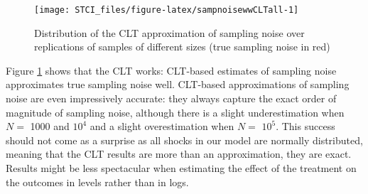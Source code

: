 \documentclass[]{book}
\newenvironment{Shaded}{\begin{snugshade}}{\end{snugshade}}
\newcommand{\ControlFlowTok}[1]{\textcolor[rgb]{0.13,0.29,0.53}{\textbf{#1}}}
\newcommand{\DataTypeTok}[1]{\textcolor[rgb]{0.13,0.29,0.53}{#1}}
\newcommand{\DecValTok}[1]{\textcolor[rgb]{0.00,0.00,0.81}{#1}}
\newcommand{\KeywordTok}[1]{\textcolor[rgb]{0.13,0.29,0.53}{\textbf{#1}}}
\newcommand{\NormalTok}[1]{#1}
\newcommand{\OperatorTok}[1]{\textcolor[rgb]{0.81,0.36,0.00}{\textbf{#1}}}
\newcommand{\StringTok}[1]{\textcolor[rgb]{0.31,0.60,0.02}{#1}}
\theoremstyle{definition}
\theoremstyle{definition}
\theoremstyle{definition}
\theoremstyle{remark}
\begin{document}
\begin{Shaded}
\end{Shaded}

\begin{figure}[htbp]

{\centering \texttt{[image: STCI\_files/figure-latex/sampnoisewwCLTall-1]} 

}

\caption{Distribution of the CLT approximation of sampling noise over replications of samples of different sizes (true sampling noise in red)}\label{fig:sampnoisewwCLTall}
\end{figure}

Figure \ref{fig:sampnoisewwCLTall} shows that the CLT works: CLT-based estimates of sampling noise approximates true sampling noise well.
CLT-based approximations of sampling noise are even impressively accurate: they always capture the exact order of magnitude of sampling noise, although there is a slight underestimation when \(N=\) 1000 and \ensuremath{10^{4}} and a slight overestimation when \(N=\) \ensuremath{10^{5}}.
This success should not come as a surprise as all shocks in our model are normally distributed, meaning that the CLT results are more than an approximation, they are exact.
Results might be less spectacular when estimating the effect of the treatment on the outcomes in levels rather than in logs.
\end{document}
